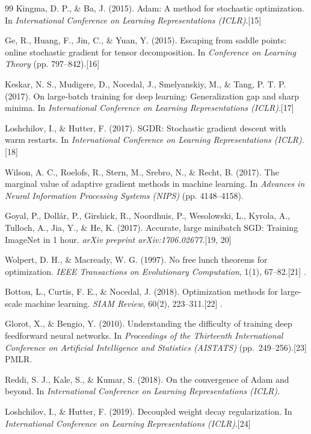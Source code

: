 \begin{thebibliography}{99}
	Kingma, D. P., \& Ba, J. (2015).
	Adam: A method for stochastic optimization.
	In \emph{International Conference on Learning Representations (ICLR)}.[15]
	
	Ge, R., Huang, F., Jin, C., \& Yuan, Y. (2015).
	Escaping from saddle points: online stochastic gradient for tensor decomposition.
	In \emph{Conference on Learning Theory} (pp. 797--842).[16]
	
	Keskar, N. S., Mudigere, D., Nocedal, J., Smelyanskiy, M., \& Tang, P. T. P. (2017).
	On large-batch training for deep learning: Generalization gap and sharp minima.
	In \emph{International Conference on Learning Representations (ICLR)}.[17]
	
	Loshchilov, I., \& Hutter, F. (2017).
	SGDR: Stochastic gradient descent with warm restarts.
	In \emph{International Conference on Learning Representations (ICLR)}.[18]
	
	Wilson, A. C., Roelofs, R., Stern, M., Srebro, N., \& Recht, B. (2017).
	The marginal value of adaptive gradient methods in machine learning.
	In \emph{Advances in Neural Information Processing Systems (NIPS)} (pp. 4148--4158).
	
	Goyal, P., Dollár, P., Girshick, R., Noordhuis, P., Wesolowski, L., Kyrola, A., Tulloch, A., Jia, Y., \& He, K. (2017).
	Accurate, large minibatch SGD: Training ImageNet in 1 hour.
	\emph{arXiv preprint arXiv:1706.02677}.[19, 20]
	
	Wolpert, D. H., \& Macready, W. G. (1997). 
	No free lunch theorems for optimization. 
	\emph{IEEE Transactions on Evolutionary Computation}, 1(1), 67--82.[21]
	.
	
	Bottou, L., Curtis, F. E., \& Nocedal, J. (2018).
	Optimization methods for large-scale machine learning.
	\emph{SIAM Review}, 60(2), 223--311.[22]
	.
	
	Glorot, X., \& Bengio, Y. (2010).
	Understanding the difficulty of training deep feedforward neural networks.
	In \emph{Proceedings of the Thirteenth International Conference on Artificial Intelligence and Statistics (AISTATS)} (pp.~249--256).[23]
	PMLR.
	
	Reddi, S. J., Kale, S., \& Kumar, S. (2018).
	On the convergence of Adam and beyond.
	In \emph{International Conference on Learning Representations (ICLR)}.
	
	Loshchilov, I., \& Hutter, F. (2019).
	Decoupled weight decay regularization.
	In \emph{International Conference on Learning Representations (ICLR)}.[24]
	
\end{thebibliography}
